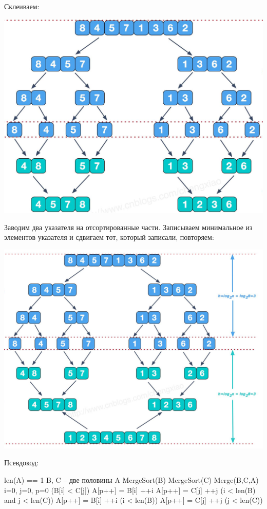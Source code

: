 \begin{multicols}{2}
\begin{center}
    \end{center}
    Склеиваем:
    \begin{center}
        \includegraphics[scale=0.25]{images/5th_step.png}
    \end{center}
    Заводим два указателя на отсортированные части. Записываем минимальное из элементов указателя и сдвигаем тот, который записали, повторяем:
    \begin{center}
        \includegraphics[scale=0.2]{images/Full.png}
    \end{center}
    Псевдокод:
    \begin{algorithmic}[1]
        \If len(A) == 1 
        \State \Return
        \EndIf
        \State B, C -- две половины A
        \State MergeSort(B)
        \State MergeSort(C)
        \State Merge(B,C,A)
        \EndFunction
        \State i=0, j=0, p=0
        \Repeat  
        \If (B[i] < C[j])
        \State A[p++] = B[i]
        \State ++i
        \Else
        \State A[p++] = C[j]
        \State ++j
        \EndIf
        \Until (i < len(B) and j < len(C))
        \Repeat 
        \State A[p++] = B[i]
        \State ++i
        \Until (i < len(B))
        \Repeat 
        \State A[p++] = C[j]
        \State ++j
        \Until (j < len(C))
        \EndFunction
    \end{algorithmic}

\end{multicols}
